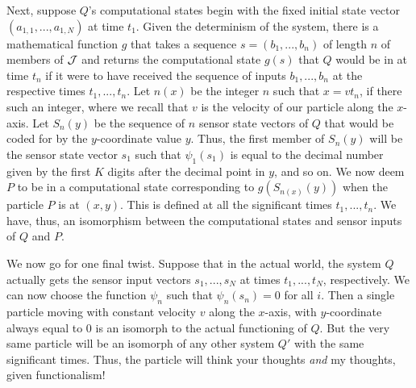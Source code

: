 Next, suppose $Q$'s computational states begin with the fixed initial state vector $(a_{1,1},...,a_{1,N})$ at time $t_1$. Given 
the determinism of the system, there is a mathematical function $g$ that takes a sequence $s=(b_1,...,b_n)$ of length $n$ of members of $\mathcal J$ 
and returns the computational state $g(s)$ that $Q$ would be in at time $t_n$ if it were to have received the sequence of inputs $b_1,...,b_n$ 
at the respective times $t_1,...,t_n$. Let $n(x)$ be the integer $n$ such that $x=v t_n$, if there such an integer, where we recall that
$v$ is the velocity of our particle along the $x$-axis. Let $S_n(y)$ be the sequence of $n$ sensor state vectors of $Q$ that would be coded for by the $y$-coordinate value $y$. Thus, the first member of $S_n(y)$ will be the sensor state vector
$s_1$ such that $\psi_1(s_1)$ is equal to the decimal number given by the first $K$ digits after the decimal point in $y$, and so on.
We now deem $P$ to be in a computational state corresponding to $g(S_{n(x)}(y))$ when the particle $P$ is at $(x,y)$. This is defined at all the
significant times $t_1,...,t_n$. We have, thus, an isomorphism between the computational states and sensor inputs of $Q$ and $P$.

We now go for one final twist. Suppose that in the actual world, the
system $Q$ actually gets the sensor input vectors $s_1,...,s_N$ at times $t_1,...,t_N$, respectively. We can now choose the 
function $\psi_n$ such that $\psi_n(s_n)=0$ for all $i$. Then a single particle moving with constant velocity 
$v$ along the $x$-axis, with $y$-coordinate always equal to $0$ is an isomorph to the actual functioning of $Q$.
But the very same particle will be an isomorph of any other system $Q'$ with the same significant times. Thus,
the particle will think your thoughts \textit{and} my thoughts, given functionalism!

\chaptertail 


